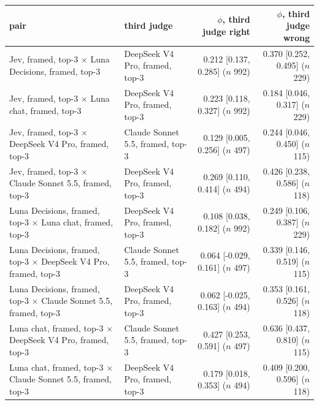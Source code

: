 \begin{tabular}{llrr}
\toprule
pair & third judge & $\phi$, third judge right & $\phi$, third judge wrong \\
\midrule
Jev, framed, top-3 $\times$ Luna Decisions, framed, top-3 & DeepSeek V4 Pro, framed, top-3 & 0.212 [0.137, 0.285] ($n$ 992) & 0.370 [0.252, 0.495] ($n$ 229) \\
Jev, framed, top-3 $\times$ Luna chat, framed, top-3 & DeepSeek V4 Pro, framed, top-3 & 0.223 [0.118, 0.327] ($n$ 992) & 0.184 [0.046, 0.317] ($n$ 229) \\
Jev, framed, top-3 $\times$ DeepSeek V4 Pro, framed, top-3 & Claude Sonnet 5.5, framed, top-3 & 0.129 [0.005, 0.256] ($n$ 497) & 0.244 [0.046, 0.450] ($n$ 115) \\
Jev, framed, top-3 $\times$ Claude Sonnet 5.5, framed, top-3 & DeepSeek V4 Pro, framed, top-3 & 0.269 [0.110, 0.414] ($n$ 494) & 0.426 [0.238, 0.586] ($n$ 118) \\
Luna Decisions, framed, top-3 $\times$ Luna chat, framed, top-3 & DeepSeek V4 Pro, framed, top-3 & 0.108 [0.038, 0.182] ($n$ 992) & 0.249 [0.106, 0.387] ($n$ 229) \\
Luna Decisions, framed, top-3 $\times$ DeepSeek V4 Pro, framed, top-3 & Claude Sonnet 5.5, framed, top-3 & 0.064 [-0.029, 0.161] ($n$ 497) & 0.339 [0.146, 0.519] ($n$ 115) \\
Luna Decisions, framed, top-3 $\times$ Claude Sonnet 5.5, framed, top-3 & DeepSeek V4 Pro, framed, top-3 & 0.062 [-0.025, 0.163] ($n$ 494) & 0.353 [0.161, 0.526] ($n$ 118) \\
Luna chat, framed, top-3 $\times$ DeepSeek V4 Pro, framed, top-3 & Claude Sonnet 5.5, framed, top-3 & 0.427 [0.253, 0.591] ($n$ 497) & 0.636 [0.437, 0.810] ($n$ 115) \\
Luna chat, framed, top-3 $\times$ Claude Sonnet 5.5, framed, top-3 & DeepSeek V4 Pro, framed, top-3 & 0.179 [0.018, 0.353] ($n$ 494) & 0.409 [0.200, 0.596] ($n$ 118) \\
\bottomrule
\end{tabular}

